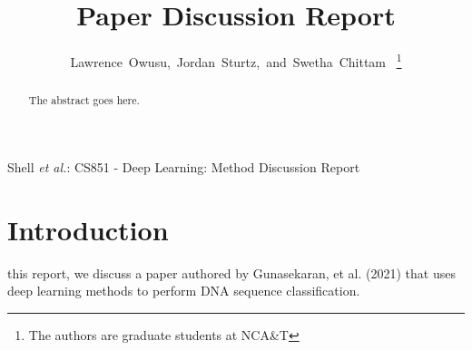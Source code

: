 \documentclass[journal]{IEEEtran}
\begin{document}
%
\title{Paper Discussion Report}

\author{Lawrence~Owusu,~Jordan~Sturtz,~and~Swetha~Chittam~%
  \thanks{The authors are graduate students at NCA\&T}%
}

%

%
{Shell \MakeLowercase{\textit{et al.}}: CS851 - Deep Learning: Method Discussion Report}

\maketitle

\begin{abstract}
The abstract goes here.
\end{abstract}



%
\IEEEpeerreviewmaketitle

\section{Introduction}

%
 this report, we discuss a paper authored by Gunasekaran, et al. (2021)
that uses deep learning methods to perform DNA sequence classification.
\end{document}

